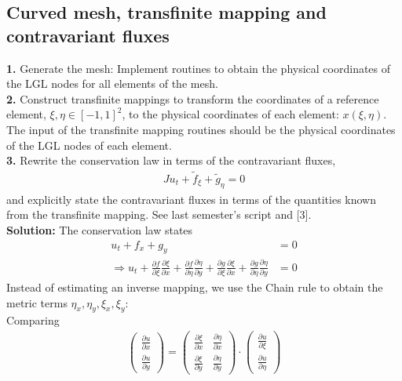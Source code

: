 \documentclass[11pt]{scrartcl}
\begin{document}
\subsection{Curved mesh, transfinite mapping and contravariant fluxes}
\textbf{1.} Generate the mesh: Implement routines to obtain the physical coordinates of the LGL nodes for all elements of the mesh.\\
\textbf{2.} Construct transfinite mappings to transform the coordinates of a reference element, $ \xi, \eta \in [-1, 1]^2$, to the physical coordinates of each element: $x(\xi,\eta)$. The input of the transfinite mapping routines should be the physical coordinates of the LGL nodes of each element.\\
\textbf{3.} Rewrite the conservation law in terms of the contravariant fluxes,
\begin{align*}
  J u_t + \tilde{f}_\xi +\tilde{g}_\eta =0
\end{align*}
and explicitly state the contravariant fluxes in terms of the quantities known from the transfinite mapping. See last semester’s script and [3]. \\
\textbf{Solution:}
The conservation law states 
\begin{align}
 u_t + f_x +g_y &= 0 \\
 \Rightarrow  u_t + \frac{\partial f}{\partial\xi} \frac{\partial\xi}{\partial x}+\frac{\partial f}{\partial \eta} \frac{\partial \eta}{\partial y} + \frac{\partial g}{\partial\xi} \frac{\partial\xi}{\partial x}+\frac{\partial g}{\partial\eta} \frac{\partial\eta}{\partial y} &= 0
\label{contravariant1}
\end{align}
Instead of estimating an inverse mapping, we use the Chain rule to obtain the metric terms $\eta_x, \eta_y, \xi_x, \xi_y$:\\
Comparing
\begin{align*}
\begin{pmatrix}
\frac{\partial u}{\partial x} \\
\frac{\partial u}{\partial y}
\end{pmatrix} =
\begin{pmatrix}
\frac{\partial \xi}{\partial x} & \frac{\partial \eta}{\partial x}\\
\frac{\partial \xi}{\partial y} & \frac{\partial \eta}{\partial y}
\end{pmatrix} \cdot
\begin{pmatrix}
\frac{\partial u}{\partial \xi} \\
\frac{\partial u}{\partial \eta}
\end{pmatrix}
\end{align*}
\end{document}
